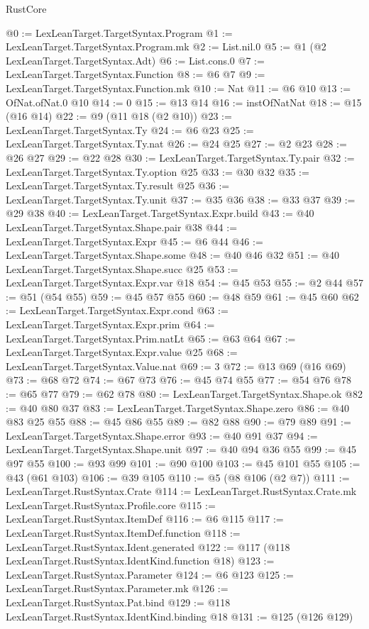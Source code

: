 \begin{lexlean}{RustCore}
\begin{coremodule}
@0 := LexLeanTarget.TargetSyntax.Program
@1 := LexLeanTarget.TargetSyntax.Program.mk
@2 := List.nil.{0}
@5 := @1 (@2 LexLeanTarget.TargetSyntax.Adt)
@6 := List.cons.{0}
@7 := LexLeanTarget.TargetSyntax.Function
@8 := @6 @7
@9 := LexLeanTarget.TargetSyntax.Function.mk
@10 := Nat
@11 := @6 @10
@13 := OfNat.ofNat.{0} @10
@14 := 0
@15 := @13 @14
@16 := instOfNatNat
@18 := @15 (@16 @14)
@22 := @9 (@11 @18 (@2 @10))
@23 := LexLeanTarget.TargetSyntax.Ty
@24 := @6 @23
@25 := LexLeanTarget.TargetSyntax.Ty.nat
@26 := @24 @25
@27 := @2 @23
@28 := @26 @27
@29 := @22 @28
@30 := LexLeanTarget.TargetSyntax.Ty.pair
@32 := LexLeanTarget.TargetSyntax.Ty.option @25
@33 := @30 @32
@35 := LexLeanTarget.TargetSyntax.Ty.result @25
@36 := LexLeanTarget.TargetSyntax.Ty.unit
@37 := @35 @36
@38 := @33 @37
@39 := @29 @38
@40 := LexLeanTarget.TargetSyntax.Expr.build
@43 := @40 LexLeanTarget.TargetSyntax.Shape.pair @38
@44 := LexLeanTarget.TargetSyntax.Expr
@45 := @6 @44
@46 := LexLeanTarget.TargetSyntax.Shape.some
@48 := @40 @46 @32
@51 := @40 LexLeanTarget.TargetSyntax.Shape.succ @25
@53 := LexLeanTarget.TargetSyntax.Expr.var @18
@54 := @45 @53
@55 := @2 @44
@57 := @51 (@54 @55)
@59 := @45 @57 @55
@60 := @48 @59
@61 := @45 @60
@62 := LexLeanTarget.TargetSyntax.Expr.cond
@63 := LexLeanTarget.TargetSyntax.Expr.prim
@64 := LexLeanTarget.TargetSyntax.Prim.natLt
@65 := @63 @64
@67 := LexLeanTarget.TargetSyntax.Expr.value @25
@68 := LexLeanTarget.TargetSyntax.Value.nat
@69 := 3
@72 := @13 @69 (@16 @69)
@73 := @68 @72
@74 := @67 @73
@76 := @45 @74 @55
@77 := @54 @76
@78 := @65 @77
@79 := @62 @78
@80 := LexLeanTarget.TargetSyntax.Shape.ok
@82 := @40 @80 @37
@83 := LexLeanTarget.TargetSyntax.Shape.zero
@86 := @40 @83 @25 @55
@88 := @45 @86 @55
@89 := @82 @88
@90 := @79 @89
@91 := LexLeanTarget.TargetSyntax.Shape.error
@93 := @40 @91 @37
@94 := LexLeanTarget.TargetSyntax.Shape.unit
@97 := @40 @94 @36 @55
@99 := @45 @97 @55
@100 := @93 @99
@101 := @90 @100
@103 := @45 @101 @55
@105 := @43 (@61 @103)
@106 := @39 @105
@110 := @5 (@8 @106 (@2 @7))
@111 := LexLeanTarget.RustSyntax.Crate
@114 := LexLeanTarget.RustSyntax.Crate.mk LexLeanTarget.RustSyntax.Profile.core
@115 := LexLeanTarget.RustSyntax.ItemDef
@116 := @6 @115
@117 := LexLeanTarget.RustSyntax.ItemDef.function
@118 := LexLeanTarget.RustSyntax.Ident.generated
@122 := @117 (@118 LexLeanTarget.RustSyntax.IdentKind.function @18)
@123 := LexLeanTarget.RustSyntax.Parameter
@124 := @6 @123
@125 := LexLeanTarget.RustSyntax.Parameter.mk
@126 := LexLeanTarget.RustSyntax.Pat.bind
@129 := @118 LexLeanTarget.RustSyntax.IdentKind.binding @18
@131 := @125 (@126 @129)

\end{coremodule}
\end{lexlean}

